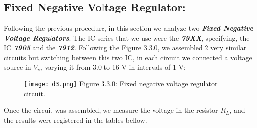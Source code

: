\subsection{Fixed Negative Voltage Regulator:}

Following the previous procedure, in this section we analyze two {\bfseries\itshape Fixed Negative Voltage Regulators}. The IC series that we use were the {\bfseries\itshape 79XX}, specifying, the IC {\bfseries\itshape 7905} and the {\bfseries\itshape 7912}. Following the Figure 3.3.0, we assembled 2 very similar circuits but switching between this two IC, in each circuit we connected a voltage source in $V_{in}$ varying it from 3.0 to 16 V in intervals of 1 V:

\begin{figure}[H]
\texttt{[image: d3.png]}
\centering \linebreak \linebreak Figure 3.3.0: Fixed negative voltage regulator circuit.
\end{figure}

Once the circuit was assembled, we measure the voltage in the resistor $R_{L}$, and the results were registered in the tables bellow. \hfill \break

{\bfseries\itshape\color{armygreen}{Observation:}} {\itshape{}} \hfill

